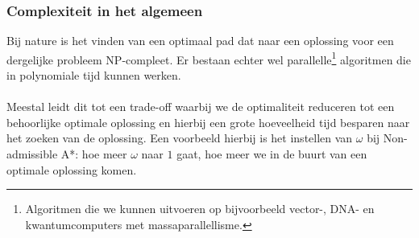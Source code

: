 \subsubsection{Complexiteit in het algemeen}
Bij nature is het vinden van een optimaal pad dat naar een oplossing voor een dergelijke probleem NP-compleet. Er bestaan echter wel parallelle\footnote{Algoritmen die we kunnen uitvoeren op bijvoorbeeld vector-, DNA- en kwantumcomputers met massaparallellisme.} algoritmen die in polynomiale tijd kunnen werken.
\paragraph{}Meestal leidt dit tot een trade-off waarbij we de optimaliteit reduceren tot een behoorlijke optimale oplossing en hierbij een grote hoeveelheid tijd besparen naar het zoeken van de oplossing. Een voorbeeld hierbij is het instellen van $\omega$ bij Non-admissible A*: hoe meer $\omega$ naar $1$ gaat, hoe meer we in de buurt van een optimale oplossing komen.
